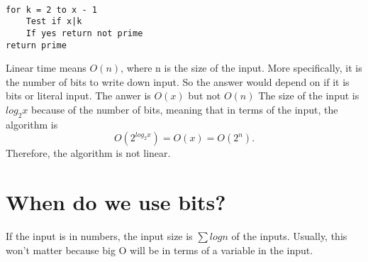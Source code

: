 \documentclass[oneside]{book}
\begin{document}
\\
\begin{lstlisting}
for k = 2 to x - 1
    Test if x|k
    If yes return not prime
return prime
\end{lstlisting}
Linear time means $O(n)$, where n is the size of the input. More specifically, it is the number of bits to write down input. So the answer would depend on if it is bits or literal input. The anwer is $O(x)$ but not $O(n)$ The size of the input is $log_2x$ because of the number of bits, meaning that in terms of the input, the algorithm is 
\[
    O(2^{log_2x}) = O(x) = O(2^n)
.\] 
Therefore, the algorithm is not linear.
\section{When do we use bits?}
If the input is in numbers, the input size is $\sum logn$ of the inputs. Usually, this won't matter because big O will be in terms of a variable in the input.
\end{document}
